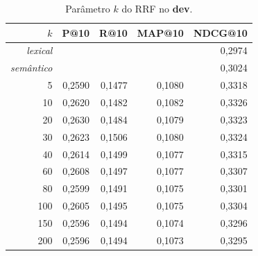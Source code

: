 \begin{table}[t]
\centering
\caption{Parâmetro $k$ do RRF no \textbf{dev}.}
\label{tab:dev_rrf}
\small
\begin{tabular}{rrrrr}
\toprule
$k$ & P@10 & R@10 & MAP@10 & NDCG@10 \\
\midrule
\textit{lexical} & \multicolumn{3}{c}{} & 0,2974 \\
\textit{semântico} & \multicolumn{3}{c}{} & 0,3024 \\
\midrule
5 & 0,2590 & 0,1477 & 0,1080 & 0,3318 \\
10 & 0,2620 & 0,1482 & 0,1082 & 0,3326 \\
20 & 0,2630 & 0,1484 & 0,1079 & 0,3323 \\
30 & 0,2623 & 0,1506 & 0,1080 & 0,3324 \\
40 & 0,2614 & 0,1499 & 0,1077 & 0,3315 \\
60 & 0,2608 & 0,1497 & 0,1077 & 0,3307 \\
80 & 0,2599 & 0,1491 & 0,1075 & 0,3301 \\
100 & 0,2605 & 0,1495 & 0,1075 & 0,3304 \\
150 & 0,2596 & 0,1494 & 0,1074 & 0,3296 \\
200 & 0,2596 & 0,1494 & 0,1073 & 0,3295 \\
\bottomrule
\end{tabular}
\end{table}
